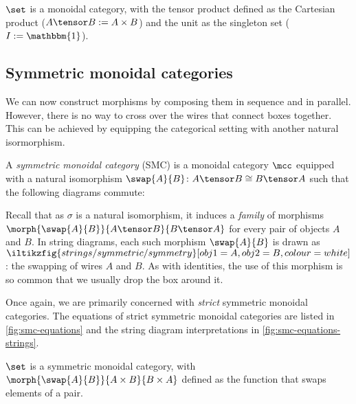


\begin{example}
    \(\set\) is a monoidal category, with the tensor product defined as the
    Cartesian product (\(A \tensor B := A \times B\)) and the unit as the
    singleton set (\(I := \mathbbm{1}\)).
\end{example}

\subsection{Symmetric monoidal categories}

We can now construct morphisms by composing them in sequence and in parallel.
However, there is no way to cross over the wires that connect boxes together.
This can be achieved by equipping the categorical setting with another natural
isormorphism.

\begin{definition}
    \label{def:symmetric-monoidal-category}
    A \emph{symmetric monoidal category} (SMC) is a monoidal category \(\mcc\)
    equipped with a natural isomorphism \(
        \swap{A}{B} \colon A \tensor B \cong B \tensor A
    \) such that the following diagrams commute:
    \begin{center}
        
        

        \vspace{1em}

        
    \end{center}
\end{definition}

Recall that as \(\sigma\) is a natural isomorphism, it induces
a \emph{family} of morphisms \(
    \morph{\swap{A}{B}}{A \tensor B}{B \tensor A}
\) for every pair of objects \(A\) and \(B\).
In string diagrams, each such morphism \(\swap{A}{B}\) is drawn as \(
    \iltikzfig{strings/symmetric/symmetry}[obj1=A, obj2=B, colour=white]
\): the swapping of wires \(A\) and \(B\).
As with identities, the use of this morphism is so common that we usually
drop the box around it.

Once again, we are primarily concerned with \emph{strict} symmetric
monoidal categories.
The equations of strict symmetric monoidal categories are listed in
\cref{fig:smc-equations} and the string diagram interpretations in
\cref{fig:smc-equations-strings}.





\begin{example}
    \(\set\) is a symmetric monoidal category, with \(
        \morph{\swap{A}{B}}{A \times B}{B \times A}
    \) defined as the function that swaps elements of a pair.
\end{example}